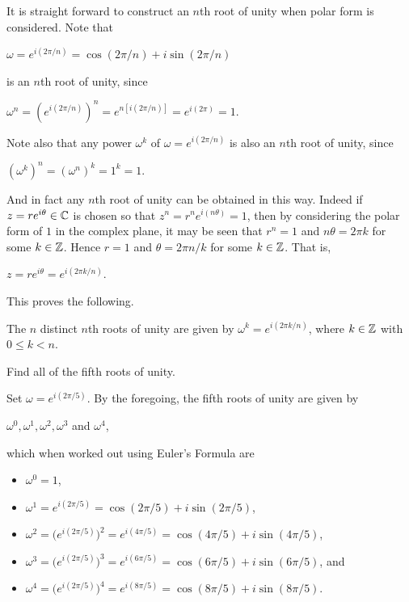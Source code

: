 \documentclass[11pt,fleqn,dvipsnames,usenames]{article}
\newcommand{\p}{\noindent}
\begin{document}
\observation It is straight forward to construct an $n$th root of unity when polar form is considered.  Note that
\begin{center}
$\omega = e^{i(2\pi/n)} = \cos(2\pi/n) + i\sin(2\pi/n)$
\end{center}
is an $n$th root of unity, since
\begin{center}
$\omega^{n} = \left(e^{i(2\pi/n)}\right)^{n} = e^{n[i(2\pi/n)]} = e^{i(2\pi)} = 1$.
\end{center}
\vsp

\p Note also that any power $\omega^{k}$ of $\omega = e^{i(2\pi/n)}$ is also an $n$th root of unity, since
\begin{center}
$\left(\omega^{k}\right)^{n} = \left(\omega^{n}\right)^{k} = 1^{k} = 1$.
\end{center}

\p And in fact any $n$th root of unity can be obtained in this way.  Indeed if $z = re^{i\theta}\in\mathbb{C}$ is chosen so that $z^n = r^ne^{i(n\theta)} = 1$, then by considering the polar form of $1$ in the complex plane, it may be seen that $r^{n} = 1$ and $n\theta = 2\pi k$ for some $k\in\mathbb{Z}$.  Hence $r = 1$ and $\theta = 2\pi n/k$ for some $k\in\mathbb{Z}$.  That is,
\begin{center}
$z = re^{i\theta} = e^{i(2\pi k/n)}$.
\end{center}
\p This proves the following.

\begin{theorem}\label{rootsofunityclassification}
The $n$ distinct $n$th roots of unity are given by $\omega^{k} = e^{i(2\pi k/n)}$, where $k\in\mathbb{Z}$ with $0\leq k < n$.
\end{theorem}

\begin{example}\label{fifthrootsunityexample}
Find all of the fifth roots of unity.
\end{example}
%
\begin{solution}
Set $\omega = e^{i(2\pi/5)}$.  By the foregoing, the fifth roots of unity are given by
\begin{center}
$\omega^{0}, \omega^{1}, \omega^{2},\omega^{3}$ and $\omega^{4}$,
\end{center}
which when worked out using Euler's Formula are
\begin{itemize}[\ ]
\item $\omega^{0} = 1$,
\item $\omega^{1} = e^{i(2\pi/5)} = \cos(2\pi/5) + i\sin(2\pi/5)$,
\item $\omega^{2} = \big(e^{i(2\pi/5)}\big)^2 = e^{i(4\pi/5)} = \cos(4\pi/5) + i \sin(4\pi/5)$,
\item $\omega^{3} = \big(e^{i(2\pi/5)}\big)^3 = e^{i(6\pi/5)} = \cos(6\pi/5) + i\sin(6\pi/5)$, and
\item $\omega^{4} = \big(e^{i(2\pi/5)}\big)^4 = e^{i(8\pi/5)} = \cos(8\pi/5) + i\sin(8\pi/5)$.
\end{itemize}
\end{solution}
\newpage
\end{document}
